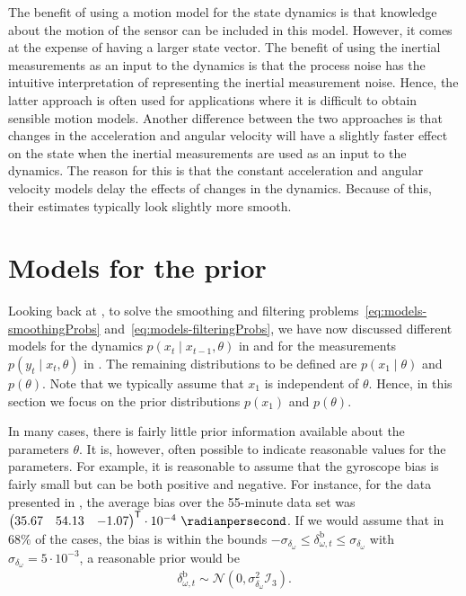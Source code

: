 The benefit of using a motion model for the state dynamics is that knowledge about the motion of the sensor can be included in this model. However, it comes at the expense of having a larger state vector. The benefit of using the inertial measurements as an input to the dynamics is that the process noise has the intuitive interpretation of representing the inertial measurement noise. Hence, the latter approach is often used for applications where it is difficult to obtain sensible motion models. Another difference between the two approaches is that changes in the acceleration and angular velocity will have a slightly faster effect on the state when the inertial measurements are used as an input to the dynamics. The reason for this is that the constant acceleration and angular velocity models delay the effects of changes in the dynamics. Because of this, their estimates typically look slightly more smooth. 

\section{Models for the prior}
\label{sec:models-prior}
Looking back at , to solve the smoothing and filtering problems~\eqref{eq:models-smoothingProbs} and~\eqref{eq:models-filteringProbs}, we have now discussed different models for the dynamics $p(x_t \mid x_{t-1},\theta)$ in  and for the measurements $p(y_t \mid x_{t},\theta)$ in . The remaining distributions to be defined are $p(x_1 \mid \theta)$ and $p(\theta)$. Note that we typically assume that $x_1$ is independent of $\theta$. Hence, in this section we focus on the prior distributions $p(x_1)$ and $p(\theta)$.

In many cases, there is fairly little prior information available about the parameters $\theta$. It is, however, often possible to indicate reasonable values for the parameters. For example, it is reasonable to assume that the gyroscope bias is fairly small but can be both positive and negative. For instance, for the data presented in , the average bias over the 55-minute data set was $\begin{pmatrix} 35.67 & 54.13 & -1.07 \end{pmatrix}^\Transp \cdot 10^{-4}~\radianpersecond$. If we would assume that in $68\%$ of the cases, the bias is within the bounds $-\sigma_{\delta_\omega} \leq \delta_{\omega,t}^\text{b} \leq \sigma_{\delta_\omega}$ with $\sigma_{\delta_\omega} = 5 \cdot 10^{-3}$, a reasonable prior would be
\begin{align}
\delta_{\omega,t}^\text{b} \sim \mathcal{N}(0,\sigma^2_{\delta_\omega} \mathcal{I}_3).
\end{align}


